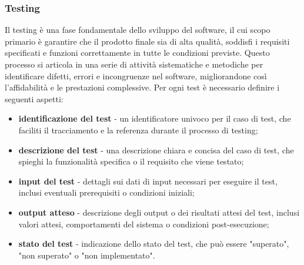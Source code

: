 \hypertarget{testing}{\subsubsection{Testing}}
Il testing è una fase fondamentale dello sviluppo del software, il cui scopo primario è garantire che il prodotto finale sia di alta qualità, soddisfi i requisiti specificati e funzioni correttamente in tutte le condizioni previste. Questo processo si articola in una serie di attività sistematiche e metodiche per identificare difetti, errori e incongruenze nel software, migliorandone così l'affidabilità e le prestazioni complessive.
Per ogni test è necessario definire i seguenti aspetti:
\begin{itemize}
	\item \textbf{identificazione del test} - un identificatore univoco per il caso di test, che faciliti il tracciamento e la referenza durante il processo di testing;
	\item \textbf{descrizione del test} - una descrizione chiara e concisa del caso di test, che spieghi la funzionalità specifica o il requisito che viene testato;
	\item \textbf{input del test} - dettagli sui dati di input necessari per eseguire il test, inclusi eventuali prerequisiti o condizioni iniziali;
	\item \textbf{output atteso} - descrizione degli output o dei risultati attesi del test, inclusi valori attesi, comportamenti del sistema o condizioni post-esecuzione;
	\item \textbf{stato del test} - indicazione dello stato del test, che può essere "superato", "non superato" o "non implementato".
\end{itemize}

